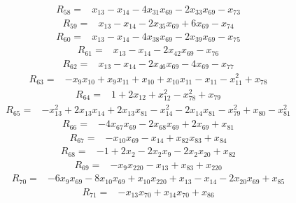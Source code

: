 \begin{align*}
R_{58}={}& x_{13} - x_{14} - 4x_{31}x_{69} - 2x_{33}x_{69} - x_{73}
\end{align*}
\begin{align*}
R_{59}={}& x_{13} - x_{14} - 2x_{35}x_{69} + 6x_{69} - x_{74}
\end{align*}
\begin{align*}
R_{60}={}& x_{13} - x_{14} - 4x_{38}x_{69} - 2x_{39}x_{69} - x_{75}
\end{align*}
\begin{align*}
R_{61}={}& x_{13} - x_{14} - 2x_{42}x_{69} - x_{76}
\end{align*}
\begin{align*}
R_{62}={}& x_{13} - x_{14} - 2x_{46}x_{69} - 4x_{69} - x_{77}
\end{align*}
\begin{align*}
R_{63}={}& -x_{9}x_{10} + x_{9}x_{11} + x_{10} + x_{10}x_{11} - x_{11} - x_{11}^{2} + x_{78}
\end{align*}
\begin{align*}
R_{64}={}& 1 + 2x_{12} + x_{12}^{2} - x_{78}^{2} + x_{79}
\end{align*}
\begin{align*}
R_{65}={}& -x_{13}^{2} + 2x_{13}x_{14} + 2x_{13}x_{81} - x_{14}^{2} - 2x_{14}x_{81} - x_{79}^{2} + x_{80} - x_{81}^{2}
\end{align*}
\begin{align*}
R_{66}={}& -4x_{67}x_{69} - 2x_{68}x_{69} + 2x_{69} + x_{81}
\end{align*}
\begin{align*}
R_{67}={}& -x_{10}x_{69} - x_{14} + x_{82}x_{83} + x_{84}
\end{align*}
\begin{align*}
R_{68}={}& -1 + 2x_{2} - 2x_{2}x_{9} - 2x_{2}x_{20} + x_{82}
\end{align*}
\begin{align*}
R_{69}={}& -x_{9}x_{220} - x_{13} + x_{83} + x_{220}
\end{align*}
\begin{align*}
R_{70}={}& -6x_{9}x_{69} - 8x_{10}x_{69} + x_{10}x_{220} + x_{13} - x_{14} - 2x_{20}x_{69} + x_{85}
\end{align*}
\begin{align*}
R_{71}={}& -x_{13}x_{70} + x_{14}x_{70} + x_{86}
\end{align*}
